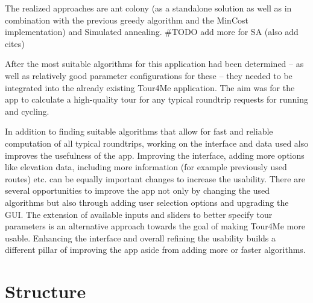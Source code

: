 The realized approaches are ant colony \cite{babaoglu_anthill_2002, gendreau_handbook_2010, wang_application_2014} (as a standalone solution as well as in combination with the previous greedy algorithm and the MinCost implementation) and Simulated annealing. \#TODO add more for SA (also add cites)

After the most suitable algorithms for this application had been determined -- as well as relatively good parameter configurations for these -- they needed to be integrated into the already existing Tour4Me application. The aim was for the app to calculate a high-quality tour for any typical roundtrip requests for running and cycling.

In addition to finding suitable algorithms that allow for fast and reliable computation of all typical roundtrips, working on the interface and data used also improves the usefulness of the app.
Improving the interface, adding more options like elevation data, including more information (for example previously used routes) etc. can be equally important changes to increase the usability.
There are several opportunities to improve the app not only by changing the used algorithms but also through adding user selection options and upgrading the GUI.
The extension of available inputs and sliders to better specify tour parameters is an alternative approach towards the goal of making Tour4Me more usable.
Enhancing the interface and overall refining the usability builds a different pillar of improving the app aside from adding more or faster algorithms.










\section{Structure}
\label{sec:structure}


